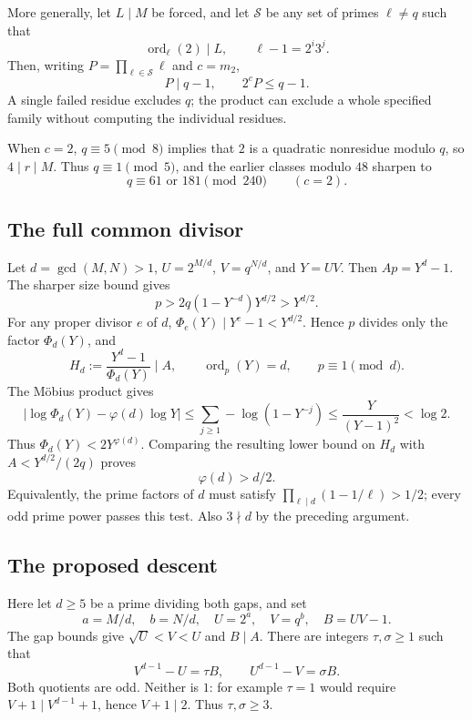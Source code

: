 \documentclass[11pt]{article}
\begin{document}
More generally, let $L\mid M$ be forced, and let $\mathcal S$ be
any set of primes $\ell\ne q$ such that
\[
\operatorname{ord}_\ell(2)\mid L,\qquad \ell-1=2^i3^j.
\]
Then, writing $P=\prod_{\ell\in\mathcal S}\ell$ and $c=m_2$,
\begin{equation}\label{eq:forced-residue-product}
\boxed{P\mid q-1,\qquad 2^cP\le q-1.}
\end{equation}
A single failed residue excludes $q$; the product can exclude a whole
specified family without computing the individual residues.

When $c=2$, $q\equiv5\pmod8$ implies that $2$ is a quadratic
nonresidue modulo $q$, so $4\mid r\mid M$. Thus $q\equiv1\pmod5$,
and the earlier classes modulo $48$ sharpen to
\[
q\equiv61\text{ or }181\pmod{240}\qquad(c=2).
\]

\subsection{The full common divisor}
\label{sec:full-gcd}
Let $d=\gcd(M,N)>1$, $U=2^{M/d}$, $V=q^{N/d}$, and $Y=UV$.
Then $Ap=Y^d-1$. The sharper size bound gives
\[
p>2q(1-Y^{-d})Y^{d/2}>Y^{d/2}.
\]
For any proper divisor $e$ of $d$, $\Phi_e(Y)\mid Y^e-1<Y^{d/2}$.
Hence $p$ divides only the factor $\Phi_d(Y)$, and
\[
H_d:=\frac{Y^d-1}{\Phi_d(Y)}\mid A,\qquad
\operatorname{ord}_p(Y)=d,\qquad p\equiv1\pmod d.
\]
The M\"obius product gives
\[
\left|\log\Phi_d(Y)-\varphi(d)\log Y\right|
\leq\sum_{j\geq1}-\log(1-Y^{-j})
\leq\frac{Y}{(Y-1)^2}<\log2.
\]
Thus $\Phi_d(Y)<2Y^{\varphi(d)}$. Comparing the resulting lower bound
on $H_d$ with $A<Y^{d/2}/(2q)$ proves
\[
\boxed{\varphi(d)>d/2.}
\]
Equivalently, the prime factors of $d$ must satisfy
$\prod_{\ell\mid d}(1-1/\ell)>1/2$; every odd prime power passes this test.
Also $3\nmid d$ by the preceding argument.

\subsection{The proposed descent}
\label{sec:descent}
Here let $d\geq5$ be a prime dividing both gaps, and set
\[
a=M/d,\quad b=N/d,\quad U=2^a,\quad V=q^b,\quad B=UV-1.
\]
The gap bounds give $\sqrt U<V<U$ and $B\mid A$.
There are integers $\tau,\sigma\geq1$ such that
\begin{equation}\label{eq:quotient-pair}
V^{d-1}-U=\tau B,\qquad U^{d-1}-V=\sigma B.
\end{equation}
Both quotients are odd. Neither is $1$: for example $\tau=1$ would
require $V+1\mid V^{d-1}+1$, hence $V+1\mid2$.
Thus $\tau,\sigma\geq3$.
\end{document}
